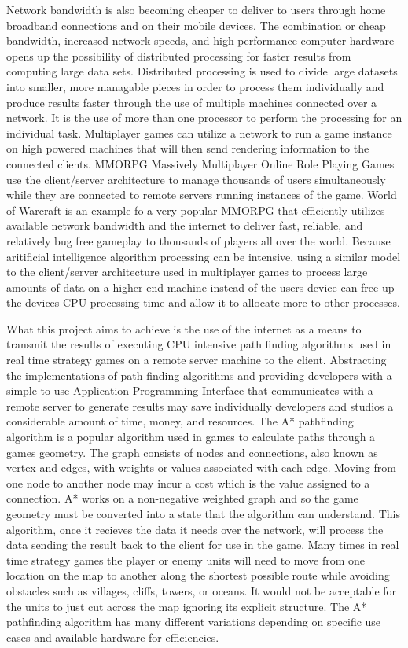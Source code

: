 \documentclass[12pt,a4paper,titlepage]{article}
\begin{document}
Network bandwidth is also becoming cheaper to deliver to users through home broadband connections and on their mobile devices. The combination or cheap bandwidth, increased network speeds, and high performance computer hardware opens up the possibility of distributed processing for faster results from computing large data sets. Distributed processing is used to divide large datasets into smaller, more managable pieces in order to process them individually and produce results faster through the use of multiple machines connected over a network. It is the use of more than one processor to perform the processing for an individual task\cite{distributedprocessing}. Multiplayer games can utilize a network to run a game instance on high powered machines that will then send rendering information to the connected clients. MMORPG Massively Multiplayer Online Role Playing Games use the client/server architecture to manage thousands of users simultaneously while they are connected to remote servers running instances of the game. World of Warcraft\cite{worldofwarcraft} is an example fo a very popular MMORPG that efficiently utilizes available network bandwidth and the internet to deliver fast, reliable, and relatively bug free gameplay to thousands of players all over the world. Because aritificial intelligence algorithm processing can be intensive, using a similar model to the client/server architecture used in multiplayer games to process large amounts of data on a higher end machine instead of the users device can free up the devices CPU processing time and allow it to allocate more to other processes.

What this project aims to achieve is the use of the internet as a means to transmit the results of executing CPU intensive path finding algorithms used in real time strategy games on a remote server machine to the client. Abstracting the implementations of path finding algorithms and providing developers with a simple to use Application Programming Interface that communicates with a remote server to generate results may save individually developers and studios a considerable amount of time, money, and resources. The A* pathfinding algorithm is a popular algorithm used in games to calculate paths through a games geometry. The graph consists of nodes and connections, also known as vertex and edges, with weights or values associated with each edge. Moving from one node to another node may incur a cost which is the value assigned to a connection. A* works on a non-negative weighted graph\cite[p.~198]{nonnegativeweightedgraph} and so the game geometry must be converted into a state that the algorithm can understand. This algorithm, once it recieves the data it needs over the network, will process the data sending the result back to the client for use in the game. Many times in real time strategy games the player or enemy units will need to move from one location on the map to another along the shortest possible route while avoiding obstacles such as villages, cliffs, towers, or oceans. It would not be acceptable for the units to just cut across the map ignoring its explicit structure. The A* pathfinding algorithm has many different variations depending on specific use cases and available hardware for efficiencies. 
\end{document}
